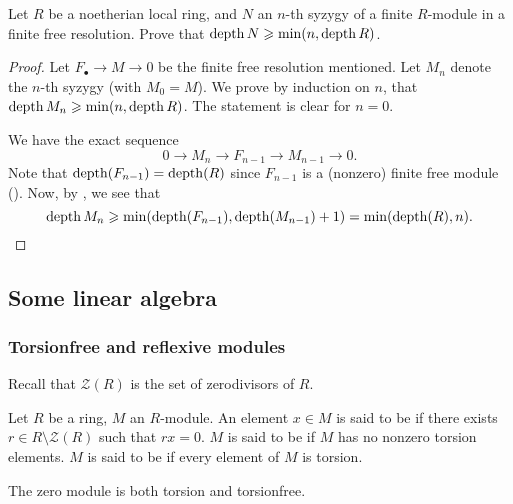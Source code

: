 \documentclass[12pt]{article}
\begin{document}
\begin{ex}
	Let $R$ be a noetherian local ring, and $N$ an $n$-th syzygy of a finite $R$-module in a finite free resolution. Prove that $\operatorname{depth} N \geqslant \min(n, \operatorname{depth} R)$.
\end{ex}
\begin{proof} 
	Let $F_{\bullet} \to M \to 0$ be the finite free resolution mentioned. Let $M_{n}$ denote the $n$-th syzygy (with $M_{0} = M$). We prove by induction on $n$, that $\operatorname{depth} M_{n} \geqslant \min(n, \operatorname{depth} R)$. The statement is clear for $n = 0$. 

	We have the exact sequence
	\begin{equation*} 
		0 \to M_{n} \to F_{n - 1} \to M_{n - 1} \to 0.
	\end{equation*}
	Note that $\operatorname{depth}(F_{n - 1}) = \operatorname{depth}(R)$ since $F_{n - 1}$ is a (nonzero) finite free module (). Now, by , we see that
	\begin{equation*} 
		\operatorname{depth} M_{n} \geqslant \min(\operatorname{depth}(F_{n - 1}), \operatorname{depth}(M_{n - 1}) + 1) = \min(\operatorname{depth}(R), n). \qedhere
	\end{equation*}
\end{proof}

\subsection{Some linear algebra}

\subsubsection{Torsionfree and reflexive modules}

Recall that $\mathcal{Z}(R)$ is the set of zerodivisors of $R$.
\begin{defn}
	Let $R$ be a ring, $M$ an $R$-module. An element $x \in M$ is said to be  if there exists $r \in R \setminus \mathcal{Z}(R)$ such that $r x = 0$. \newline
	$M$ is said to be  if $M$ has no nonzero torsion elements. \newline
	$M$ is said to be  if every element of $M$ is torsion.
\end{defn}
The zero module is both torsion and torsionfree.
\end{document}
